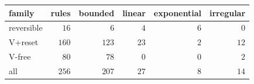 \begin{tabular}{lrrrrr}
\hline
family & rules & bounded & linear & exponential & irregular \\
\hline
reversible & $16$ & $6$ & $4$ & $6$ & $0$ \\
V+reset & $160$ & $123$ & $23$ & $2$ & $12$ \\
V-free & $80$ & $78$ & $0$ & $0$ & $2$ \\
\hline
all & $256$ & $207$ & $27$ & $8$ & $14$ \\
\hline
\end{tabular}
